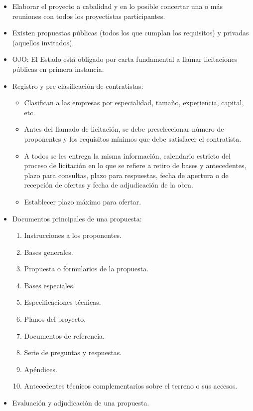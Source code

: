 \begin{itemize}
\begin{itemize}
        \item Elaborar el proyecto a cabalidad y en lo posible concertar una o más reuniones con todos los proyectistas participantes.
        \item Existen propuestas públicas (todos los que cumplan los requisitos) y privadas (aquellos invitados).
        \item OJO: El Estado está obligado por carta fundamental a llamar licitaciones públicas en primera instancia.
        \item Registro y pre-clasificación de contratistas:
        \begin{itemize}
            \item Clasifican a las empresas por especialidad, tamaño, experiencia, capital, etc.
            \item Antes del llamado de licitación, se debe preseleccionar número de proponentes y los requisitos mínimos que debe satisfacer el contratista.
            \item A todos se les entrega la misma información, calendario estricto del proceso de licitación en lo que se refiere a retiro de bases y antecedentes, plazo para consultas, plazo para respuestas, fecha de apertura o de recepción de ofertas y fecha de adjudicación de la obra.
            \item Establecer plazo máximo para ofertar.
        \end{itemize}
        \item Documentos principales de una propuesta:
        \begin{enumerate}
            \item Instrucciones a los proponentes.
            \item Bases generales.
            \item Propuesta o formularios de la propuesta.
            \item Bases especiales.
            \item Especificaciones técnicas.
            \item Planos del proyecto.
            \item Documentos de referencia.
            \item Serie de preguntas y respuestas.
            \item Apéndices.
            \item Antecedentes técnicos complementarios sobre el terreno o sus accesos.
        \end{enumerate}
        \item Evaluación y adjudicación de una propuesta.

\end{itemize}
\end{itemize}
